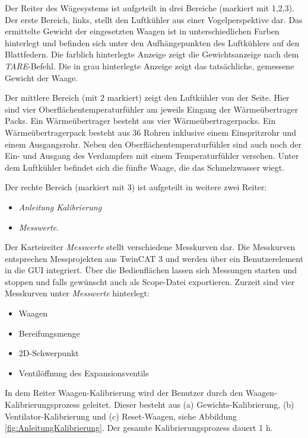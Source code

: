 Der Reiter des Wägesystems ist aufgeteilt in drei Bereiche (markiert mit 1,2,3). Der erste Bereich, links, stellt den Luftkühler aus einer Vogelperspektive dar. Das ermittelte Gewicht der eingesetzten Waagen ist in unterschiedlichen Farben hinterlegt und befinden sich unter den Aufhängepunkten des Luftkühlers auf den Blattfedern. Die farblich hinterlegte Anzeige zeigt die Gewichtsanzeige nach dem \textit{TARE}-Befehl. Die in grau hinterlegte Anzeige zeigt das tatsächliche, gemessene Gewicht der Waage. 

Der mittlere Bereich (mit 2 markiert) zeigt den Luftkühler von der Seite. Hier sind vier Oberflächentemperaturfühler am jeweils Eingang der Wärmeübertrager Packs. Ein Wärmeübertrager besteht aus vier Wärmeübertragerpacks. Ein Wärmeübertragerpack besteht aus 36 Rohren inklusive einem Einspritzrohr und einem Ausgangsrohr. Neben den Oberflächentemperaturfühler sind auch noch der Ein- und Ausgang des Verdampfers mit einem Temperaturfühler versehen. Unter dem Luftkühler befindet sich die fünfte Waage, die das Schmelzwasser wiegt. 

Der rechte Bereich (markiert mit 3) ist aufgeteilt in weitere zwei Reiter:
\begin{itemize}
\item	\textit{Anleitung Kalibrierung}
\item	\textit{Messwerte}.	
\end{itemize}


Der Karteireiter \textit{Messwerte} stellt verschiedene Messkurven dar. Die Messkurven entsprechen Messprojekten aus TwinCAT 3 und werden über ein Benutzerelement in die GUI integriert. Über die Bedienflächen lassen sich Messungen starten und stoppen und falls gewünscht auch als Scope-Datei exportieren. Zurzeit sind vier Messkurven unter \textit{Messwerte} hinterlegt:

\begin{itemize}
\item	Waagen
\item	Bereifungsmenge
\item	2D-Schwerpunkt
\item 	Ventilöffnung des Expansionsventils
\end{itemize}

In dem Reiter Waagen-Kalibrierung wird der Benutzer durch den Waagen-Kalibrierungsprozess geleitet. Dieser besteht aus (a) Gewichts-Kalibrierung, (b) Ventilator-Kalibrierung und (c) Reset-Waagen, siehe Abbildung \ref{fig:AnleitungKalibrierung}.  Der gesamte Kalibrierungsprozess dauert 1 h.


